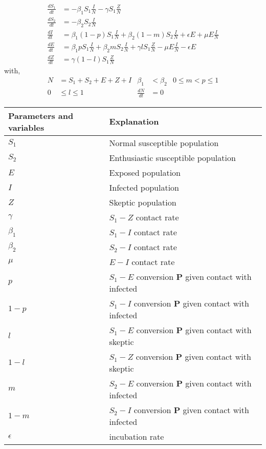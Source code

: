 \documentclass{article}
\begin{document}
\begin{equation} 
\begin{split}
\frac{dS_1}{dt} &= -{\beta}_1 S_1\frac{I}{N} -\gamma S_1\frac{Z}{N}\\
\frac{dS_2}{dt} &= -{\beta}_2 S_2\frac{I}{N}\\
\frac{dI}{dt} &= {\beta}_1 (1-p)S_1\frac{I}{N} + {\beta}_2 (1-m)S_2\frac{I}{N} + \epsilon E + \mu E\frac{I}{N}\\
\frac{dE}{dt} &= {\beta}_1 pS_1\frac{I}{N} + {\beta}_2 mS_2\frac{I}{N} + \gamma       lS_1\frac{Z}{N} - \mu E\frac{I}{N} - \epsilon E\\
\frac{dZ}{dt} &=  \gamma (1-l)S_1\frac{Z}{N}
\end{split}
\end{equation}
with,
\begin{align*}
 N& = S_1 + S_2 + E + Z + I & {\beta}_1 &< {\beta}_2  & 0\leq m<p\leq 1\\
0&\leq l \leq 1  & \frac{dN}{dt}&=0
\end{align*}


\begin{center}

\begin{tabu} to 0.8\textwidth { | X[l] | X[r] |}
 \hline
 Parameters and variables& Explanation \\
 \hline
 $S_1$  & Normal susceptible population  \\
\hline
 $S_2$ & Enthusiastic susceptible population\\
 \hline
 $E$ & Exposed population  \\
 \hline
 $I$ & Infected population  \\
 \hline
 $Z$ & Skeptic population \\
  \hline
 $\gamma$ & $S_1-Z$ contact rate \\
 \hline
 ${\beta}_1$ & $S_1-I$ contact rate \\
 \hline
 ${\beta}_2$ & $S_2-I$ contact rate \\
 \hline
 $\mu$ & $E-I$ contact rate \\
 \hline
 $p$ & $S_1-E$ conversion $\mathbf{P}$ given contact with infected \\
 \hline
 $1-p$ & $S_1-I$ conversion $\mathbf{P}$ given contact with infected \\
 \hline
 $l$ & $S_1-E$ conversion $\mathbf{P}$ given contact with skeptic \\
 \hline
 $1-l$ & $S_1-Z$ conversion $\mathbf{P}$ given contact with skeptic \\
 \hline
 $m$ & $S_2-E$ conversion $\mathbf{P}$ given contact with infected \\
 \hline
 $1-m$ & $S_2-I$ conversion $\mathbf{P}$ given contact with infected \\
 \hline
 $\epsilon$ & incubation rate \\
 \hline
 

\end{tabu}
\end{center}
\end{document}
